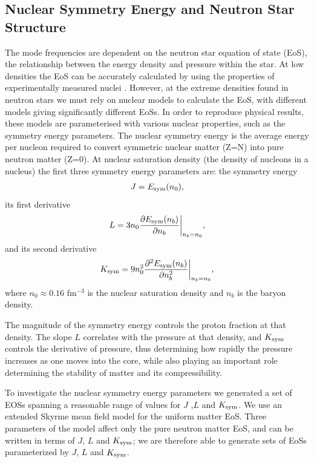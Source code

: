 \documentclass[fleqn,usenatbib]{mnras}
\begin{document}
\subsection{Nuclear Symmetry Energy and Neutron Star Structure}
\hspace{\parindent}The mode frequencies are dependent on the neutron star equation of state (EoS), the relationship between the energy density and pressure within the star. At low densities the EoS can be accurately calculated by using the properties of experimentally measured nuclei \citet{baym1971ground}. However, at the extreme densities found in neutron stars we must rely on nuclear models to calculate the EoS, with different models giving significantly different EoSs. In order to reproduce physical results, these models are parameterised with various nuclear properties, such as the symmetry energy parameters. The nuclear symmetry energy is the average energy per nucleon required to convert symmetric nuclear matter (Z=N) into pure neutron matter (Z=0). At nuclear saturation density (the density of nucleons in a nucleus) the first three symmetry energy parameters are: the symmetry energy
\begin{align}
J=E_{\rm sym}(n_0),    
\label{eq:sym_J}
\end{align}
\noindent its first derivative 
\begin{align}
L=3n_0\frac{\partial E_{\rm sym}(n_b)}{\partial n_b}\biggr\rvert_{n_b=n_0},  
\label{eq:sym_L}
\end{align}
\noindent and its second derivative
\begin{align}
K_{\rm sym}=9n_0^2\frac{\partial^2 E_{\rm sym}(n_b)}{\partial n_b^2}\biggr\rvert_{n_b=n_0},
\label{eq:sym_K}
\end{align}
\noindent where $n_0\approx 0.16$ fm$^{-3}$ is the nuclear saturation density and $n_b$ is the baryon density.

\noindent The magnitude of the symmetry energy controls the proton fraction at that density. The slope $L$ correlates with the pressure at that density, and $K_{\rm sym}$ controls the derivative of pressure, thus determining how rapidly the pressure increases as one moves into the core, while also playing an important role determining the stability of matter and its compressibility.

To investigate the nuclear symmetry energy parameters we generated a set of EOSs spanning a reasonable range of values for $J$ ,$L$ and $K_{\rm sym}$. We use an extended Skyrme mean field model for the uniform matter EoS. Three parameters of the model affect only the pure neutron matter EoS, and can be written in terms of $J$, $L$ and $K_{\rm sym}$; we are therefore able to generate sets of EoSs parameterized by $J$, $L$ and $K_{\rm sym}$.
\end{document}
